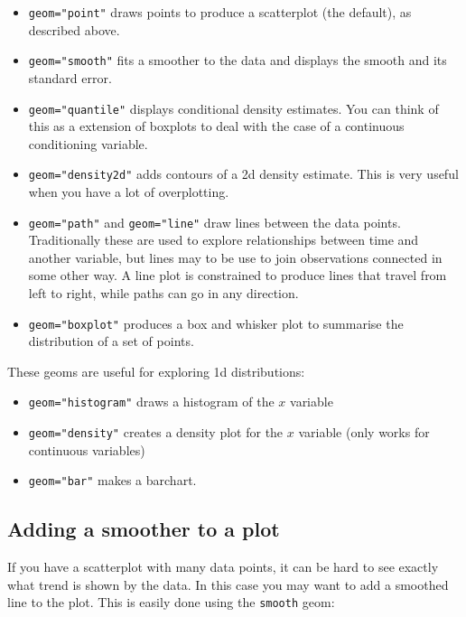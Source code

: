 \begin{itemize}
	\item {\tt geom="point"} draws points to produce a scatterplot (the default), as described above.
	\item {\tt geom="smooth"} fits a smoother to the data and displays the smooth and its standard error.
	\item {\tt geom="quantile"} displays conditional density estimates.  You can think of this as a extension of boxplots to deal with the case of a continuous conditioning variable.
	\item {\tt geom="density2d"} adds contours of a 2d density estimate.  This is very useful when you have a lot of overplotting.
	\item {\tt geom="path"} and {\tt geom="line"} draw lines between the data points.  Traditionally these are used to explore relationships between time and another variable, but lines may to be use to join observations connected in some other way.  A line plot is constrained to produce lines that travel from left to right, while paths can go in any direction.
	\item {\tt geom="boxplot"} produces a box and whisker plot to summarise the distribution of a set of points.
\end{itemize}

These geoms are useful for exploring 1d distributions:

\begin{itemize}
	\item {\tt geom="histogram"} draws a histogram of the $x$ variable 
	\item {\tt geom="density"} creates a density plot for the $x$ variable (only works for continuous variables)
  \item {\tt geom="bar"} makes a barchart.
\end{itemize}




\subsection{Adding a smoother to a plot}\label{sub:smooth}

If you have a scatterplot with many data points, it can be hard to see exactly what trend is shown by the data.  In this case you may want to add a smoothed line to the plot.  This is easily done using the {\tt smooth} geom:

